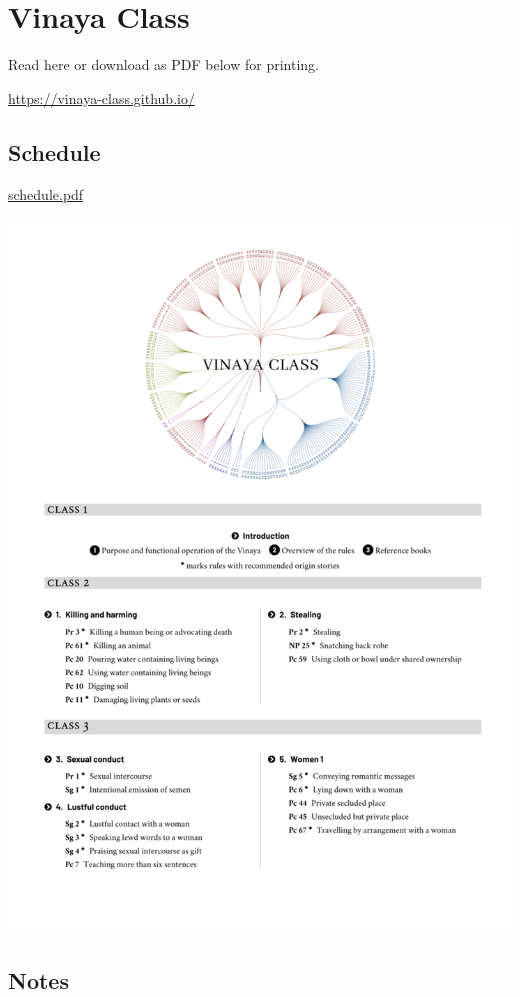 \chapter{Vinaya Class}

Read here or download as PDF below for printing.

\url{https://vinaya-class.github.io/}

\section{Schedule}

\href{./includes/docs/schedule.pdf}{schedule.pdf}

\href{./includes/docs/schedule.pdf}{\includegraphics{./includes/docs/schedule-thumb.png}}

\section{Notes}

